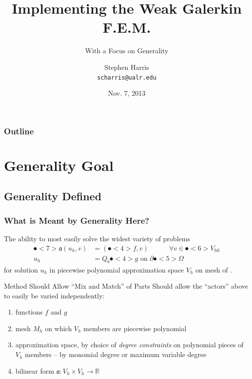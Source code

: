 \documentclass[compress]{beamer}
\title[Implementing WGFEM]{Implementing the Weak Galerkin F.E.M.}
\subtitle{With a Focus on Generality}
\author{Stephen Harris \\ \texttt{scharris@ualr.edu}}
\date{Nov. 7, 2013}
\begin{document}
\begin{frame}
  \titlepage
\end{frame}

\begin{frame}
  \frametitle{Outline}
  \tableofcontents[pausesections]
\end{frame}

\section{Generality Goal}
\subsection{Generality Defined}

\begin{frame}
  \frametitle{What is Meant by Generality Here?}
  \pause
  The ability to most easily solve the widest variety of problems
    \begin{align*}
      \spot<7>{\mathfrak{a}}(u_h,v) & = (\spot<4>{f},v)\quad\quad\quad \forall{v} \in \spot<6>{V_{h0}} \\
      u_h & = Q_b \spot<4>{g} \text{ on } \partial\spot<5>{\Omega}
    \end{align*}
    for solution $u_h$ in piecewise polynomial approximation space $V_h$ on mesh  of .
  \pause

  \begin{block}{Method Should Allow ``Mix and Match'' of Parts}
    Should allow the ``actors'' above to easily be varied independently:
    \pause
    \begin{enumerate}[<+->]
      \item functions $f$ and $g$
      \item mesh $M_h$ on which $V_h$ members are piecewise polynomial
      \item approximation space, by choice of \emph{degree constraints} on polynomial pieces of $V_h$ members -- by monomial degree or maximum variable degree
      \item bilinear form $\mathfrak{a}: V_h \times V_h \rightarrow \mathbb{R}$
    \end{enumerate}
  \end{block}

\end{frame}
\end{document}
